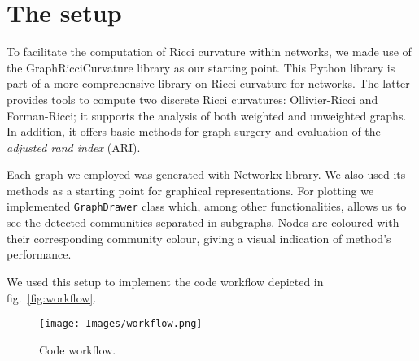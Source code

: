 \section{The setup}\label{sec5.1}
To facilitate the computation of Ricci curvature within networks, we made use of the GraphRicciCurvature library as our starting point. This Python library is part of a more comprehensive library on Ricci curvature for networks. The latter provides tools to compute two discrete Ricci curvatures: Ollivier-Ricci and Forman-Ricci; it supports the analysis of both weighted and unweighted graphs. In addition, it offers basic methods for graph surgery and evaluation of the \textit{adjusted rand index} (ARI).

Each graph we employed was generated with Networkx library. We also used its methods as a starting point for graphical representations.
For plotting we implemented \texttt{GraphDrawer} class which, among other functionalities, allows us to see the detected communities separated in subgraphs. Nodes are coloured with their corresponding community colour, giving a visual indication of method's performance. 

We used this setup to implement the code workflow depicted in fig.~\ref{fig:workflow}.

\begin{figure}
    \centering
    \texttt{[image: Images/workflow.png]}
    \caption{Code workflow.}
\end{figure}\label{fig:workflow}
